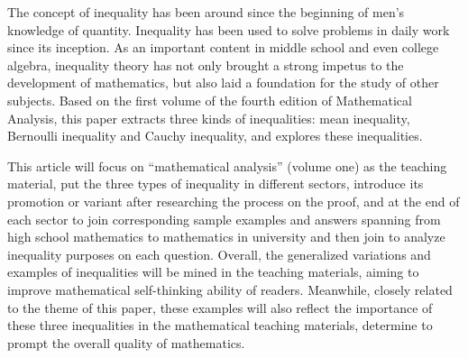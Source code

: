 \documentclass[oneside]{CCNUthesis}
\begin{document}
\begin{abstract*}
  The concept of inequality has been around since the beginning of men's knowledge of quantity. Inequality has been used to solve problems in daily work since its inception. As an important content in middle school and even college algebra, inequality theory has not only brought a strong impetus to the development of mathematics, but also laid a foundation for the study of other subjects. Based on the first volume of the fourth edition of Mathematical Analysis, this paper extracts three kinds of inequalities: mean inequality, Bernoulli inequality and Cauchy inequality, and explores these inequalities.

  This article will focus on ``mathematical analysis'' (volume one) as the teaching material, put the three types of inequality in different sectors, introduce its promotion or variant after researching the process on the proof, and at the end of each sector to join corresponding sample examples and answers spanning from high school mathematics to mathematics in university and then join to analyze inequality purposes on each question. Overall, the generalized variations and examples of inequalities will be mined in the teaching materials, aiming to improve mathematical self-thinking ability of readers. Meanwhile, closely related to the theme of this paper, these examples will also reflect the importance of these three inequalities in the mathematical teaching materials, determine to prompt the overall quality of mathematics.
\end{abstract*}


\end{document}
